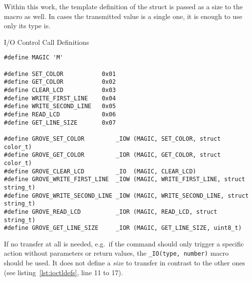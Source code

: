 Within this work, the template definition of the struct is passed as a size to the macro as well.
In cases the transmitted value is a single one, it is enough to use only its type is.
%
\begin{listing} [H]
    \caption{I/O Control Call Definitions}
    \label{lst:ioctldefs}
    \begin{verbatim}
#define MAGIC 'M'

#define SET_COLOR           0x01
#define GET_COLOR           0x02
#define CLEAR_LCD           0x03
#define WRITE_FIRST_LINE    0x04
#define WRITE_SECOND_LINE   0x05
#define READ_LCD            0x06
#define GET_LINE_SIZE       0x07

#define GROVE_SET_COLOR         _IOW (MAGIC, SET_COLOR, struct color_t) 
#define GROVE_GET_COLOR         _IOR (MAGIC, GET_COLOR, struct color_t)
#define GROVE_CLEAR_LCD         _IO  (MAGIC, CLEAR_LCD)
#define GROVE_WRITE_FIRST_LINE  _IOW (MAGIC, WRITE_FIRST_LINE, struct string_t)
#define GROVE_WRITE_SECOND_LINE _IOW (MAGIC, WRITE_SECOND_LINE, struct string_t)
#define GROVE_READ_LCD          _IOR (MAGIC, READ_LCD, struct string_t)
#define GROVE_GET_LINE_SIZE     _IOR (MAGIC, GET_LINE_SIZE, uint8_t)
    \end{verbatim}
\end{listing}
%
If no transfer at all is needed, e.g.\ if the command should only trigger a specific action without parameters or return values, the \texttt{_IO(type, number)} macro should be used.
It does not define a \textit{size} to transfer in contrast to the other ones (see listing~\ref{lst:ioctldefs}, line 11 to 17).

